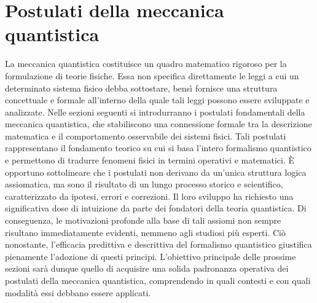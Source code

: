 \documentclass[a4paper,12pt]{report}
\theoremstyle{plain}
\begin{document}
\section{Postulati della meccanica quantistica}
La meccanica quantistica costituisce un quadro matematico rigoroso per la formulazione di teorie fisiche. Essa non specifica direttamente le leggi a cui un determinato sistema fisico debba sottostare, bensì fornisce una struttura concettuale e formale all'interno della quale tali leggi possono essere sviluppate e analizzate.
Nelle sezioni seguenti si introdurranno i postulati fondamentali della meccanica quantistica, che stabiliscono una connessione formale tra la descrizione matematica e il comportamento osservabile dei sistemi fisici. Tali postulati rappresentano il fondamento teorico su cui si basa l'intero formalismo quantistico e permettono di tradurre fenomeni fisici in termini operativi e matematici.
È opportuno sottolineare che i postulati non derivano da un'unica struttura logica assiomatica, ma sono il risultato di un lungo processo storico e scientifico, caratterizzato da ipotesi, errori e correzioni. Il loro sviluppo ha richiesto una significativa dose di intuizione da parte dei fondatori della teoria quantistica. Di conseguenza, le motivazioni profonde alla base di tali assiomi non sempre risultano immediatamente evidenti, nemmeno agli studiosi più esperti. Ciò nonostante, l'efficacia predittiva e descrittiva del formalismo quantistico giustifica pienamente l'adozione di questi principi.
L'obiettivo principale delle prossime sezioni sarà dunque quello di acquisire una solida padronanza operativa dei postulati della meccanica quantistica, comprendendo in quali contesti e con quali modalità essi debbano essere applicati.
\end{document}
